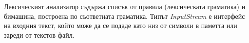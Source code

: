 \documentclass[12pt, oneside]{article}
\theoremstyle{definition}
\begin{document}
Лексическият анализатор съдържа списък от правила (лексическата граматика) и бимашина, построена по съответната граматика. Типът \emph{InputStream} е интерфейс на входния текст, който може да се подаде като низ от символи в паметта или зареди от текстов файл.




\end{document}
